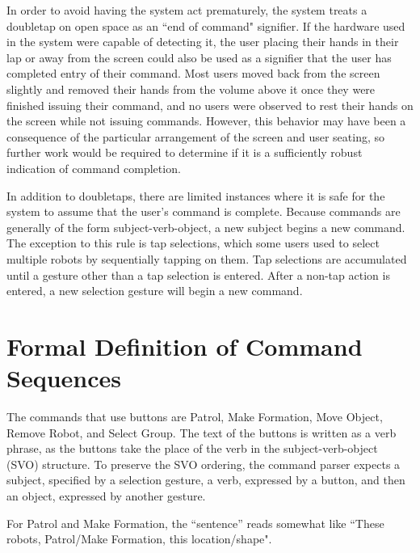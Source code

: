In order to avoid having the system act prematurely, the system treats a doubletap on open space as an ``end of command" signifier.
If the hardware used in the system were capable of detecting it, the user placing their hands in their lap or away from the screen could also be used as a signifier that the user has completed entry of their command. 
Most users moved back from the screen slightly and removed their hands from the volume above it once they were finished issuing their command, and no users were observed to rest their hands on the screen while not issuing commands. 
However, this behavior may have been a consequence of the particular arrangement of the screen and user seating, so further work would be required to determine if it is a sufficiently robust indication of command completion. 

In addition to doubletaps, there are limited instances where it is safe for the system to assume that the user's command is complete. 
Because commands are generally of the form subject-verb-object, a new subject begins a new command. 
The exception to this rule is tap selections, which some users used to select multiple robots by sequentially tapping on them. 
Tap selections are accumulated until a gesture other than a tap selection is entered.
After a non-tap action is entered, a new selection gesture will begin a new command. 

\section{Formal Definition of Command Sequences}

The commands that use buttons are Patrol, Make Formation, Move Object, Remove Robot, and Select Group. 
The text of the buttons is written as a verb phrase, as the buttons take the place of the verb in the subject-verb-object (SVO) structure. 
To preserve the SVO ordering, the command parser expects a subject, specified by a selection gesture, a verb, expressed by a button, and then an object, expressed by another gesture. 

For Patrol and Make Formation, the ``sentence'' reads somewhat like ``These robots, Patrol/Make Formation, this location/shape". 


